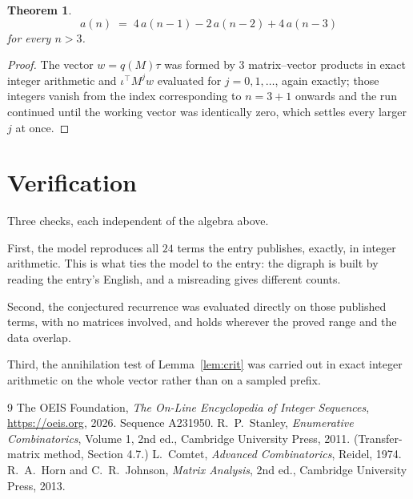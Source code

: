\documentclass[11pt,a4paper]{article}
\theoremstyle{plain}
\newtheorem{theorem}{Theorem}
\theoremstyle{definition}
\begin{document}
\begin{theorem}
\[
a(n)\;=\;4\,a(n-1) - 2\,a(n-2) + 4\,a(n-3)
\]
for every $n>3$.
\end{theorem}

\begin{proof}
The vector $w=q(M)\tau$ was formed by $3$ matrix--vector products in exact integer
arithmetic and $\iota^{\!\top}M^{j}w$ evaluated for $j=0,1,\dots$, again exactly; those
integers vanish from the index corresponding to $n=3+1$ onwards and the run continued
until the working vector was identically zero, which settles every larger $j$ at once.
\end{proof}

\section{Verification}

Three checks, each independent of the algebra above.

First, the model reproduces all $24$ terms the entry publishes, exactly, in integer
arithmetic. This is what ties the model to the entry: the digraph is built by reading the
entry's English, and a misreading gives different counts.

Second, the conjectured recurrence was evaluated directly on those published terms, with no
matrices involved, and holds wherever the proved range and the data overlap.

Third, the annihilation test of Lemma~\ref{lem:crit} was carried out in exact integer
arithmetic on the whole vector rather than on a sampled prefix.

\begin{thebibliography}{9}
 The OEIS Foundation, \emph{The On-Line Encyclopedia of Integer
Sequences}, \url{https://oeis.org}, 2026. Sequence A231950.
 R.~P.~Stanley, \emph{Enumerative Combinatorics}, Volume 1, 2nd ed.,
Cambridge University Press, 2011. (Transfer-matrix method, Section 4.7.)
 L.~Comtet, \emph{Advanced Combinatorics}, Reidel, 1974.
 R.~A.~Horn and C.~R.~Johnson, \emph{Matrix Analysis}, 2nd ed., Cambridge
University Press, 2013.
\end{thebibliography}
\end{document}
